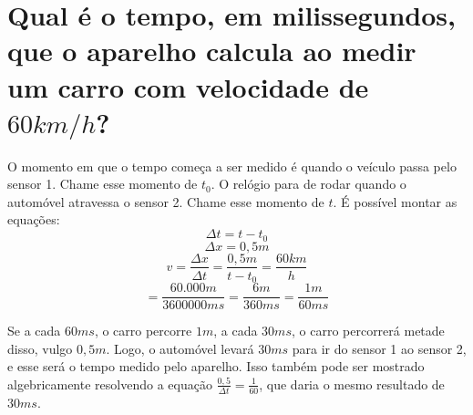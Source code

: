 \documentclass[a4paper]{article}
\begin{document}
\section{Qual é o tempo, em milissegundos, que o aparelho calcula ao medir um carro com velocidade de \(60km/h\)?}
\hspace{\parindent}O momento em que o tempo começa a ser medido é quando o veículo passa pelo sensor 1. Chame esse momento de \(t_0\). O relógio para de rodar quando o automóvel atravessa o sensor 2. Chame esse momento de \(t\). É possível montar as equações:
\[\Delta t=t-t_0\]
\[\Delta x = 0,5m\]
\[v=\frac{\Delta x}{\Delta t}=\frac{0,5m}{t-t_0}=\frac{60km}{h}\]
\[=\frac{60.000m}{3600000ms}= \frac{6m}{360ms} = \frac{1m}{60ms}\]

\par Se a cada \(60ms\), o carro percorre \(1m\), a cada \(30ms\), o carro percorrerá metade disso, vulgo \(0,5m\). Logo, o automóvel levará \(30ms\) para ir do sensor 1 ao sensor 2, e esse será o tempo medido pelo aparelho. Isso também pode ser mostrado algebricamente resolvendo a equação \(\frac{0,5}{\Delta t}=\frac{1}{60}\), que daria o mesmo resultado de \(30ms\).
\end{document}

